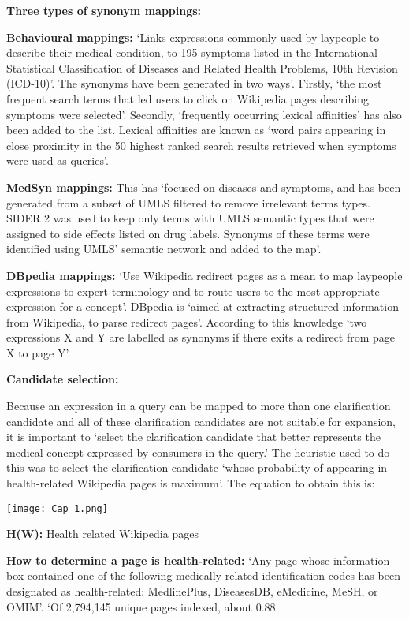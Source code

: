 \documentclass[]{article}
\begin{document}
\textbf{Three types of synonym mappings:}


\textbf{Behavioural mappings:} ‘Links expressions commonly used by laypeople to describe their medical condition, to 195 symptoms listed in the International Statistical Classification of Diseases and Related Health Problems, 10th Revision (ICD-10)’. The synonyms have been generated in two ways’. Firstly, ‘the most frequent search terms that led users to click on Wikipedia pages describing symptoms were selected’. Secondly, ‘frequently occurring lexical affinities’ has also been added to the list. Lexical affinities are known as ‘word pairs appearing in close proximity in the 50 highest ranked search results retrieved when symptoms were used as queries’.


\textbf{MedSyn mappings:} This has ‘focused on diseases and symptoms, and has been generated from a subset of UMLS filtered to remove irrelevant terms types. SIDER 2 was used to keep only terms with UMLS semantic types that were assigned to side effects listed on drug labels. Synonyms of these terms were identified using UMLS’ semantic network and added to the map'.


\textbf{DBpedia  mappings:} ‘Use Wikipedia redirect pages as a mean to map laypeople expressions to expert terminology and to route users to the most appropriate expression for a concept’. DBpedia is ‘aimed at extracting structured information from Wikipedia, to parse redirect pages’. According to this knowledge ‘two expressions X and Y are labelled as synonyms if there exits a redirect from page X to page Y’. 


\textbf{Candidate selection:}

Because an expression in a query can be mapped to more than one clarification candidate and all of these clarification candidates are not suitable for expansion, it is important to ‘select the clarification candidate that better represents the medical concept expressed by consumers in the query.’ The heuristic used to do this was to select the clarification candidate ‘whose probability of appearing in health-related Wikipedia pages is maximum’. The equation to obtain this is:

\texttt{[image: Cap 1.png]}


\textbf{H(W):} Health related Wikipedia pages

\textbf{How to determine a page is health-related:}  ‘Any page whose information box contained one of the following medically-related identification codes has been designated as health-related: MedlinePlus, DiseasesDB, eMedicine, MeSH, or OMIM’. ‘Of 2,794,145 unique pages indexed, about 0.88 %
\end{document}

